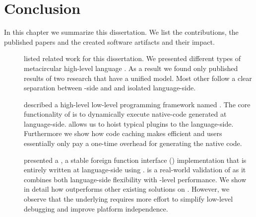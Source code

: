 
\chapter{Conclusion}
\minitoc
\introduction

In this chapter we summarize this dissertation.
We list the contributions, the published papers and the created software artifacts and their impact.

\begin{description}
\item[] listed related work for this dissertation.
	We presented different types of metacircular high-level language \VMs.
	As a result we found only published results of two research \VM that have a unified model.
	Most other \VMs follow a clear separation between \VM-side and and isolated language-side.


\item[] described a high-level low-level programming framework named \B.
	The core functionality of \B is to dynamically execute native-code generated at language-side.
	\B allows us to hoist typical \VM plugins to the language-side.
	Furthermore we show how code caching makes \B efficient and users essentially only pay a one-time overhead for generating the native code.
	
\item[] presented a \NB, a stable foreign function interface (\FFI) implementation that is entirely written at language-side using \B.
	\NB is a real-world validation of \B as it combines both language-side flexibility with \VM-level performance.
	We show in detail how \NB outperforms other existing \FFI solutions on \PH.
	However, we observe that the underlying \B requires more effort to simplify low-level debugging and improve platform independence.


\end{description}
